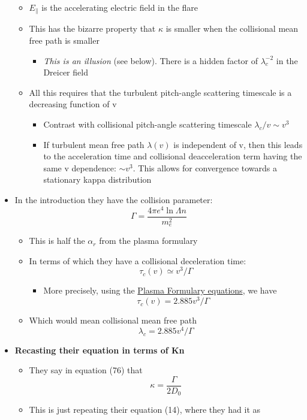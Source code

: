 \documentclass[11pt]{article}
\begin{document}
\begin{itemize}
\begin{itemize}
\item \(E_{\parallel}\) is the accelerating electric field in the flare
\item This has the bizarre property that \(\kappa\) is smaller when the collisional mean free path is smaller
\begin{itemize}
\item \emph{This is an illusion} (see below). There is a hidden factor of \(\lambda_{c}^{-2}\) in the Dreicer field
\end{itemize}
\item All this requires that the turbulent pitch-angle scattering timescale is a decreasing function of v
\begin{itemize}
\item Contrast with collisional pitch-angle scattering timescale \(\lambda_{c} / v \sim v^{3}\)
\item If turbulent mean free path \(\lambda(v)\) is independent of v, then this leads to the acceleration time and collisional deacceleration term having the same v dependence: \(\sim v^{3}\).  This allows for convergence towards a stationary kappa distribution
\end{itemize}
\end{itemize}
\item In the introduction they have the collision parameter:
\[
  \Gamma = \frac{4 \pi e^{4} \ln\Lambda n} {m_{e}^{2}}
  \]
\begin{itemize}
\item This is half the \(\alpha_{r}\) from the plasma formulary
\item In terms of which they have a collisional deceleration time:
\[ \tau_{c}(v) \simeq v^{3} / \Gamma \]
\begin{itemize}
\item More precisely, using the \href{kappa-collisions.org}{Plasma Formulary equations}, we have
\[\tau_{c}(v) = 2.885 v^{3} / \Gamma \]
\end{itemize}
\item Which would mean collisional mean free path \[\lambda_{c} = 2.885 v^{4}/\Gamma\]
\end{itemize}
\item \textbf{Recasting their equation in terms of Kn}
\begin{itemize}
\item They say in equation (76) that 
\[
    \kappa = \frac{\Gamma}{2 D_{0}}
    \]
\item This is just repeating their equation (14), where they had it as

\end{itemize}
\end{itemize}
\end{document}
